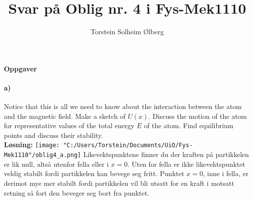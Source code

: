 \documentclass[11pt, A4paper,norsk]{article}
\author{Torstein Solheim Ølberg}
\title{Svar på Oblig nr. 4 i Fys-Mek1110}
\begin{document}
\maketitle
	\begin{center}
\Large \textbf{Oppgaver}
	\end{center}













		\paragraph{a)}
			\begin{flushleft}
Notice that this is all we need to know about the interaction between the atom and the magnetic field. Make a sketch of $U(x)$. Discuss the motion of the atom for representative values of the total energy $E$ of the atom. Find equilibrium points and discuss their stability. \\
\vspace{1mm}
\textbf{Løsning:}
\vspace{1mm}
\texttt{[image: "C:/Users/Torstein/Documents/UiO/Fys-Mek1110"/oblig4\_a.png]}
Likevektspunktene finner du der kraften på partikkelen er lik null, altså utenfor fella eller i $x = 0$. Uten for fella er ikke likevektspunktet veldig stabilt fordi partikkelen kan bevege seg fritt. Punktet $x = 0$, inne i fella, er derimot mye mer stabilt fordi partikkelen vil bli utsatt for en kraft i motsatt retning så fort den beveger seg bort fra punktet.
			\end{flushleft}
\end{document}
